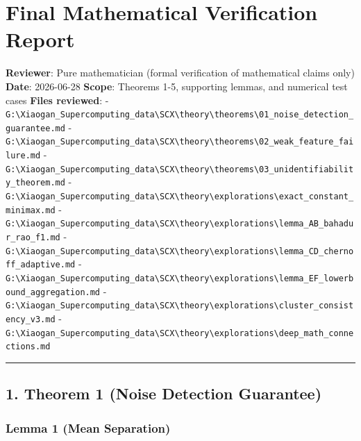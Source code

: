 \documentclass[
  12pt,
]{article}
\author{SCX}
\date{2026}
\begin{document}
\section{Final Mathematical Verification
Report}\label{final-mathematical-verification-report}

\textbf{Reviewer}: Pure mathematician (formal verification of
mathematical claims only) \textbf{Date}: 2026-06-28 \textbf{Scope}:
Theorems 1-5, supporting lemmas, and numerical test cases \textbf{Files
reviewed}: -
\texttt{G:\textbackslash{}Xiaogan\_Supercomputing\_data\textbackslash{}SCX\textbackslash{}theory\textbackslash{}theorems\textbackslash{}01\_noise\_detection\_guarantee.md}
-
\texttt{G:\textbackslash{}Xiaogan\_Supercomputing\_data\textbackslash{}SCX\textbackslash{}theory\textbackslash{}theorems\textbackslash{}02\_weak\_feature\_failure.md}
-
\texttt{G:\textbackslash{}Xiaogan\_Supercomputing\_data\textbackslash{}SCX\textbackslash{}theory\textbackslash{}theorems\textbackslash{}03\_unidentifiability\_theorem.md}
-
\texttt{G:\textbackslash{}Xiaogan\_Supercomputing\_data\textbackslash{}SCX\textbackslash{}theory\textbackslash{}explorations\textbackslash{}exact\_constant\_minimax.md}
-
\texttt{G:\textbackslash{}Xiaogan\_Supercomputing\_data\textbackslash{}SCX\textbackslash{}theory\textbackslash{}explorations\textbackslash{}lemma\_AB\_bahadur\_rao\_f1.md}
-
\texttt{G:\textbackslash{}Xiaogan\_Supercomputing\_data\textbackslash{}SCX\textbackslash{}theory\textbackslash{}explorations\textbackslash{}lemma\_CD\_chernoff\_adaptive.md}
-
\texttt{G:\textbackslash{}Xiaogan\_Supercomputing\_data\textbackslash{}SCX\textbackslash{}theory\textbackslash{}explorations\textbackslash{}lemma\_EF\_lowerbound\_aggregation.md}
-
\texttt{G:\textbackslash{}Xiaogan\_Supercomputing\_data\textbackslash{}SCX\textbackslash{}theory\textbackslash{}explorations\textbackslash{}cluster\_consistency\_v3.md}
-
\texttt{G:\textbackslash{}Xiaogan\_Supercomputing\_data\textbackslash{}SCX\textbackslash{}theory\textbackslash{}explorations\textbackslash{}deep\_math\_connections.md}

\begin{center}\rule{0.5\linewidth}{0.5pt}\end{center}

\subsection{1. Theorem 1 (Noise Detection
Guarantee)}\label{theorem-1-noise-detection-guarantee}

\subsubsection{Lemma 1 (Mean Separation)}\label{lemma-1-mean-separation}
\end{document}
